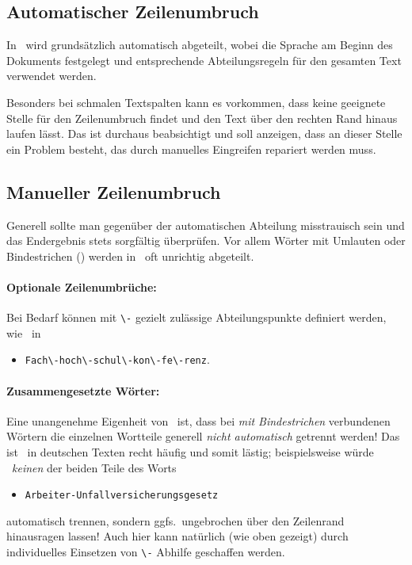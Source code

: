 \subsection{Automatischer Zeilenumbruch}

In \latex\ wird grundsätzlich automatisch abgeteilt, wobei die Sprache am
Beginn des Dokuments festgelegt und entsprechende Abteilungsregeln für den
gesamten Text verwendet werden.

Besonders bei schmalen Textspalten kann es vorkommen, dass \latex keine
geeignete Stelle für den Zeilenumbruch findet und den Text über den rechten
Rand hinaus laufen lässt. Das ist durchaus beabsichtigt und soll anzeigen,
dass an dieser Stelle ein Problem besteht, das durch manuelles Eingreifen
repariert werden muss.

\subsection{Manueller Zeilenumbruch}

Generell sollte man gegenüber der automatischen Abteilung misstrauisch sein
und das Endergebnis stets sorgfältig überprüfen. Vor allem Wörter mit
Umlauten oder Bindestrichen (\su) werden in \latex\ oft unrichtig abgeteilt.

\paragraph{Optionale Zeilenumbrüche:} Bei Bedarf können mit \verb!\-! gezielt
zulässige Abteilungspunkte definiert werden, wie \zB\ in
%
\begin{itemize}
    \item[] \verb!Fach\-hoch\-schul\-kon\-fe\-renz!.
\end{itemize}

\paragraph{Zusammengesetzte Wörter:} Eine unangenehme Eigenheit von \latex\
ist, dass bei \emph{mit Bindestrichen} verbundenen Wörtern die einzelnen
Wortteile generell \emph{nicht automatisch} getrennt werden! Das ist \va\ in
deutschen Texten recht häufig und somit lästig; beispielsweise würde \latex\
\emph{keinen} der beiden Teile des Worts
%
\begin{itemize}
    \item[] \verb!Arbeiter-Unfallversicherungsgesetz!
\end{itemize}
%
automatisch trennen, sondern ggfs.\ ungebrochen über den Zeilenrand hinausragen
lassen! Auch hier kann natürlich (wie oben gezeigt) durch individuelles
Einsetzen von \verb!\-! Abhilfe geschaffen werden.


